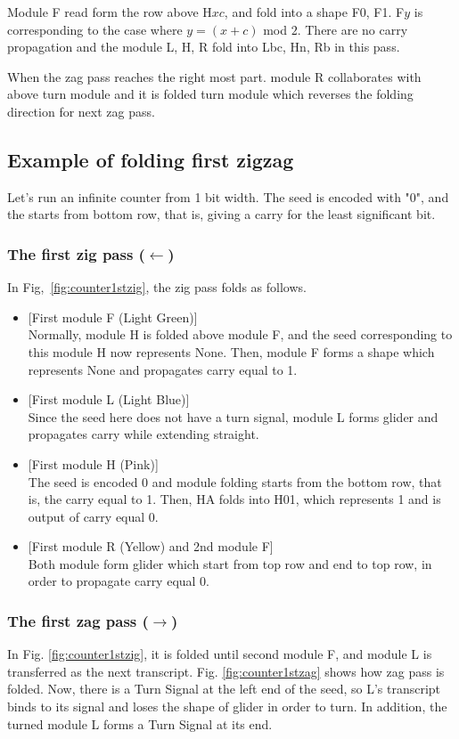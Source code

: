 \documentclass[runningheads]{llncs}
\begin{document}
Module F read form the row above H$xc$, and fold into a shape F0, F1.
F$y$ is corresponding to the case where $y = (x + c)$ mod $2$.
There are no carry propagation and the module L, H, R fold into Lbc, Hn, Rb in this pass.

When the zag pass reaches the right most part. module R collaborates with above turn module and it is folded turn module which reverses the folding direction for next zag pass.

\subsection{Example of folding first zigzag}
Let's run an infinite counter from 1 bit width.
The seed is encoded with "0", and the starts from bottom row, that is, giving a carry for the least significant bit.

\subsubsection{The first zig pass ($\leftarrow$)}
In Fig,~\ref{fig:counter1stzig}, the zig pass folds as follows.
\begin{itemize}
\item{[First module F (Light Green)]} \\Normally, module H is folded above module F, and the seed corresponding to this module H now represents None.
Then, module F forms a shape which represents None and propagates carry equal to 1.
\item{[First module L (Light Blue)]} \\Since the seed here does not have a turn signal, module L forms glider and propagates carry while extending straight.

\item{[First module H (Pink)]} \\The seed is encoded 0 and module folding starts from the bottom row, that is, the carry equal to 1.
Then, HA folds into H01, which represents 1 and is output of carry equal 0.

\item{[First module R (Yellow) and 2nd module F]} \\Both module form glider which start from top row and end to top row, in order to propagate carry equal 0.

\end{itemize}

\subsubsection{The first zag pass ($\rightarrow$)}
In Fig. \ref{fig:counter1stzig}, it is folded until second module F, and module L is transferred as the next transcript.
Fig. \ref{fig:counter1stzag} shows how zag pass is folded.
Now, there is a Turn Signal at the left end of the seed, so L's transcript binds to its signal and loses the shape of glider in order to turn.
In addition, the turned module L forms a Turn Signal at its end.
\end{document}
